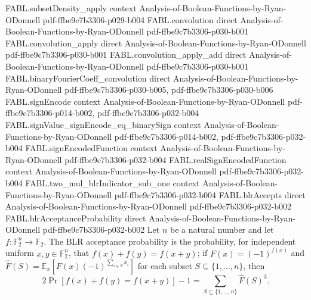 \begin{theorem}
\proofstep
  {FABL.subsetDensity_apply}
  {context}
  {Analysis-of-Boolean-Functions-by-Ryan-ODonnell}
  {pdf-ffbe9c7b3306-p029-b004}
\proofstep
  {FABL.convolution}
  {direct}
  {Analysis-of-Boolean-Functions-by-Ryan-ODonnell}
  {pdf-ffbe9c7b3306-p030-b001}
\proofstep
  {FABL.convolution_apply}
  {direct}
  {Analysis-of-Boolean-Functions-by-Ryan-ODonnell}
  {pdf-ffbe9c7b3306-p030-b001}
\proofstep
  {FABL.convolution_apply_add}
  {direct}
  {Analysis-of-Boolean-Functions-by-Ryan-ODonnell}
  {pdf-ffbe9c7b3306-p030-b001}
\proofstep
  {FABL.binaryFourierCoeff_convolution}
  {direct}
  {Analysis-of-Boolean-Functions-by-Ryan-ODonnell}
  {pdf-ffbe9c7b3306-p030-b005,
    pdf-ffbe9c7b3306-p030-b006}
\proofstep
  {FABL.signEncode}
  {context}
  {Analysis-of-Boolean-Functions-by-Ryan-ODonnell}
  {pdf-ffbe9c7b3306-p014-b002,
    pdf-ffbe9c7b3306-p032-b004}
\proofstep
  {FABL.signValue_signEncode_eq_binarySign}
  {context}
  {Analysis-of-Boolean-Functions-by-Ryan-ODonnell}
  {pdf-ffbe9c7b3306-p014-b002,
    pdf-ffbe9c7b3306-p032-b004}
\proofstep
  {FABL.signEncodedFunction}
  {context}
  {Analysis-of-Boolean-Functions-by-Ryan-ODonnell}
  {pdf-ffbe9c7b3306-p032-b004}
\proofstep
  {FABL.realSignEncodedFunction}
  {context}
  {Analysis-of-Boolean-Functions-by-Ryan-ODonnell}
  {pdf-ffbe9c7b3306-p032-b004}
\proofstep
  {FABL.two_mul_blrIndicator_sub_one}
  {context}
  {Analysis-of-Boolean-Functions-by-Ryan-ODonnell}
  {pdf-ffbe9c7b3306-p032-b004}
\proofstep
  {FABL.blrAccepts}
  {direct}
  {Analysis-of-Boolean-Functions-by-Ryan-ODonnell}
  {pdf-ffbe9c7b3306-p032-b002}
\proofstep
  {FABL.blrAcceptanceProbability}
  {direct}
  {Analysis-of-Boolean-Functions-by-Ryan-ODonnell}
  {pdf-ffbe9c7b3306-p032-b002}
Let $n$ be a natural number and let $f:\mathbb F_2^n\to\mathbb F_2$. The BLR acceptance
probability is the probability, for independent uniform $x,y\in\mathbb F_2^n$, that
$f(x)+f(y)=f(x+y)$; if $F(x)=(-1)^{f(x)}$ and $\widehat F(S)=\mathbb
E_x[F(x)(-1)^{\sum_{i\in S}x_i}]$ for each subset $S\subseteq\{1,\ldots,n\}$, then
\[2\Pr[f(x)+f(y)=f(x+y)]-1=\sum_{S\subseteq\{1,\ldots,n\}}\widehat F(S)^3.\]
\end{theorem}

